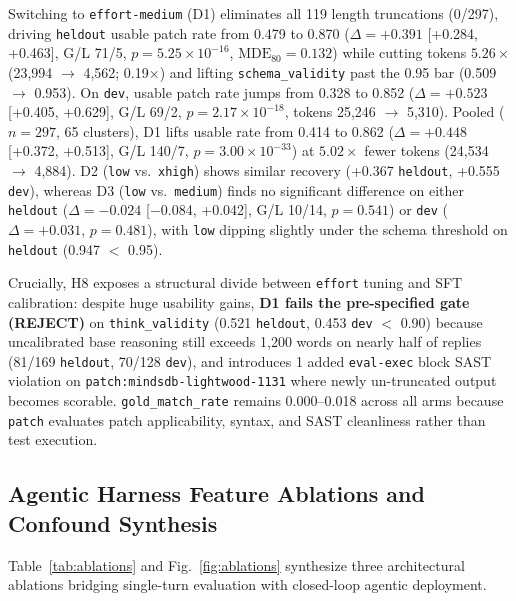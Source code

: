 \documentclass[conference]{IEEEtran}
\begin{document}
Switching to \texttt{effort-{}medium} (D1) eliminates all 119 length truncations (0/297), driving \texttt{heldout} usable patch rate from 0.479 to 0.870 ($\Delta=+0.391$ [+0.284, +0.463], G/L 71/5, $p=5.25\times 10^{-16}$, $\mathrm{MDE}_{80}=0.132$) while cutting tokens $5.26\times$ (23,994 $\to$ 4,562; 0.19$\times$) and lifting \texttt{schema\_\allowbreak{}validity} past the 0.95 bar (0.509 $\to$ 0.953). On \texttt{dev}, usable patch rate jumps from 0.328 to 0.852 ($\Delta=+0.523$ [+0.405, +0.629], G/L 69/2, $p=2.17\times 10^{-18}$, tokens 25,246 $\to$ 5,310). Pooled ($n=297$, 65 clusters), D1 lifts usable rate from 0.414 to 0.862 ($\Delta=+0.448$ [+0.372, +0.513], G/L 140/7, $p=3.00\times 10^{-33}$) at $5.02\times$ fewer tokens (24,534 $\to$ 4,884). D2 (\texttt{low} vs.\ \texttt{xhigh}) shows similar recovery (+0.367 \texttt{heldout}, +0.555 \texttt{dev}), whereas D3 (\texttt{low} vs.\ \texttt{medium}) finds no significant difference on either \texttt{heldout} ($\Delta=-0.024$ [$-$0.084, +0.042], G/L 10/14, $p=0.541$) or \texttt{dev} ($\Delta=+0.031$, $p=0.481$), with \texttt{low} dipping slightly under the schema threshold on \texttt{heldout} (0.947 $<$ 0.95).

Crucially, H8 exposes a structural divide between \texttt{effort} tuning and SFT calibration: despite huge usability gains, \textbf{D1 fails the pre-specified gate (\textbf{REJECT})} on \texttt{think\_\allowbreak{}validity} (0.521 \texttt{heldout}, 0.453 \texttt{dev} $<$ 0.90) because uncalibrated base reasoning still exceeds 1,200 words on nearly half of replies (81/169 \texttt{heldout}, 70/128 \texttt{dev}), and introduces 1 added \texttt{eval-{}exec} block SAST violation on \texttt{patch:\allowbreak{}mindsdb-{}lightwood-{}1131} where newly un-truncated output becomes scorable. \texttt{gold\_\allowbreak{}match\_\allowbreak{}rate} remains 0.000--0.018 across all arms because \texttt{patch} evaluates patch applicability, syntax, and SAST cleanliness rather than test execution.

\subsection{Agentic Harness Feature Ablations and Confound Synthesis}
\label{sec:results-ablations}

Table~\ref{tab:ablations} and Fig.~\ref{fig:ablations} synthesize three architectural ablations bridging single-turn evaluation with closed-loop agentic deployment.
\end{document}
